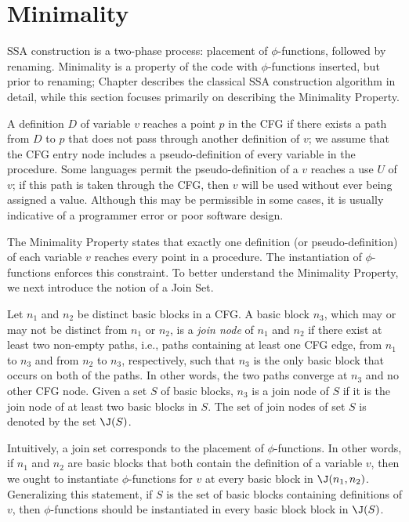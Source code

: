 \section{Minimality}

SSA construction is a two-phase process: placement of $\phi$-functions,
followed by renaming. Minimality is a property of the code with 
$\phi$-functions inserted, but prior to renaming; Chapter 
\label{chap:classical_construction} describes the classical SSA
construction algorithm in detail, while this section focuses
primarily on describing the Minimality Property. 

A definition $D$ of variable $v$ reaches a point $p$ in the CFG
if there exists a path from $D$ to $p$ that does not pass through another
definition of $v$; we assume that the CFG entry node includes a 
pseudo-definition of every variable in the procedure. Some languages
permit the pseudo-definition of a $v$ reaches a use $U$ of $v$; if this
path is taken through the CFG, then $v$ will be used without ever
being assigned a value. Although this may be permissible in
some cases, it is usually indicative of a programmer error or
poor software design. 

The Minimality Property states that exactly one definition (or
pseudo-definition) of each variable $v$ reaches every point in
a procedure. The instantiation of $\phi$-functions enforces this
constraint. To better understand the Minimality Property, we next
introduce the notion of a Join Set. 

Let $n_{1}$ and $n_{2}$ be distinct basic blocks in a CFG. A basic block
$n_{3}$, which may or may not be distinct from $n_{1}$ or $n_{2}$, is 
a \emph{join node} of $n_{1}$ and $n_{2}$ if there exist at least two
non-empty paths, i.e., paths containing at least one CFG edge, from 
$n_{1}$ to $n_{3}$ and from $n_{2}$ to $n_{3}$, respectively, such that
$n_{3}$ is the only basic block that occurs on both of the paths. In
other words, the two paths converge at $n_{3}$ and no other CFG node. 
Given a set $S$ of basic blocks, $n_{3}$ is a join node of $S$ if it
is the join node of at least two basic blocks in $S$. The set of join
nodes of set $S$ is denoted by the set $\J(S)$. 

Intuitively, a join set corresponds to the placement of $\phi$-functions.
In other words, if $n_{1}$ and $n_{2}$ are basic blocks that both
contain the definition of a variable $v$, then we ought to instantiate
$\phi$-functions for $v$ at every basic block in $\J(n_{1}, n_{2})$. 
Generalizing this statement, if $S$ is the set of basic blocks containing
definitions of $v$, then $\phi$-functions should be instantiated in
every basic block block in $\J(S)$. 

